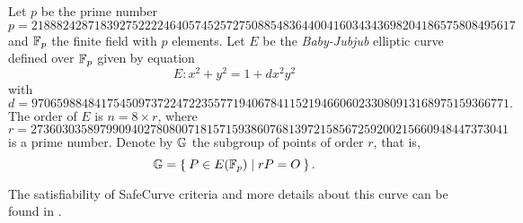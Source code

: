 Let $p$ be the prime number
$$	 {p = 218882428718392752222464057452572750885
			  48364400416034343698204186575808495617 } $$
and $\mathbb{F}_p$ the finite field with $p$ elements. 
%
Let $E$ be the {\it Baby-Jubjub} elliptic curve defined over $\mathbb{F}_p$ given %
by equation
$$	E: x^2 + y^2 = 1 +  d x^2 y^2 $$
with
$ d = 9706598848417545097372247223557719406784115219466060233080913168975159366771.$ 
The order of $E$ is $n = 8\times r$, where 
$$	r = 2736030358979909402780800718157159386076813972
		158567259200215660948447373041 $$ 
is a prime number. Denote by $\mathbb{G}$ the subgroup of points of order $r$, that is, %
$$\mathbb{G} = \Set{ P \in E(\ensuremath{\mathbb{F}_p}) | r P = O  }.$$
		
The satisfiability of SafeCurve %
criteria \cite{safe-curves} and more details about this curve can be found in %
\cite{github-barry}.



